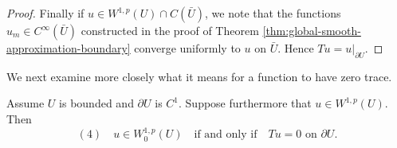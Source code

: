 \begin{proof}
Finally if $u \in W^{1,p}(U) \cap C(\bar U)$, we note that the functions $u_m \in C^\infty(\bar U)$ constructed in the proof of Theorem \ref{thm:global-smooth-approximation-boundary} converge uniformly to $u$ on $\bar U$. Hence $Tu = u|_{\partial U}$.
\end{proof}

We next examine more closely what it means for a function to have zero trace.

\begin{theorem}
\label{thm:trace-zero-characterization}
Assume $U$ is bounded and $\partial U$ is $C^1$. Suppose furthermore that $u \in W^{1,p}(U)$. Then
$$(4) \quad u \in W_0^{1,p}(U) \quad \text{if and only if} \quad Tu = 0 \text{ on } \partial U.$$
\end{theorem}


